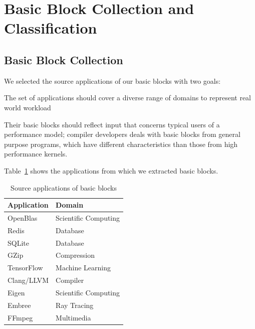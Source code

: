 \section{Basic Block Collection and Classification}
\subsection{Basic Block Collection}
We selected the source applications of our basic blocks with two goals:
\begin{enumerate*}
    \item The set of applications should cover a diverse range
of domains to represent real world workload
    \item Their basic blocks should reflect input that concerns typical users of a performance model;
    compiler developers deals with
    basic blocks from general purpose programs,
    which have different characteristics
    than those from 
    high performance kernels. 
\end{enumerate*}
Table~\ref{tab:apps} shows the applications from which we extracted basic blocks.

\begin{table}
\begin{tabular}{|p{}|p{}|}
\hline
Application & Domain \\

\hline
OpenBlas & Scientific Computing \\

\hline
Redis & Database \\

\hline
SQLite & Database \\

\hline
GZip & Compression \\

\hline
TensorFlow & Machine Learning \\

\hline 
Clang/LLVM & Compiler \\

\hline
Eigen & Scientific Computing \\

\hline
Embree & Ray Tracing\\

\hline
FFmpeg & Multimedia\\
\hline
\end{tabular}
\\
\caption{Source applications of basic blocks}
\label{tab:apps}
\end{table}

